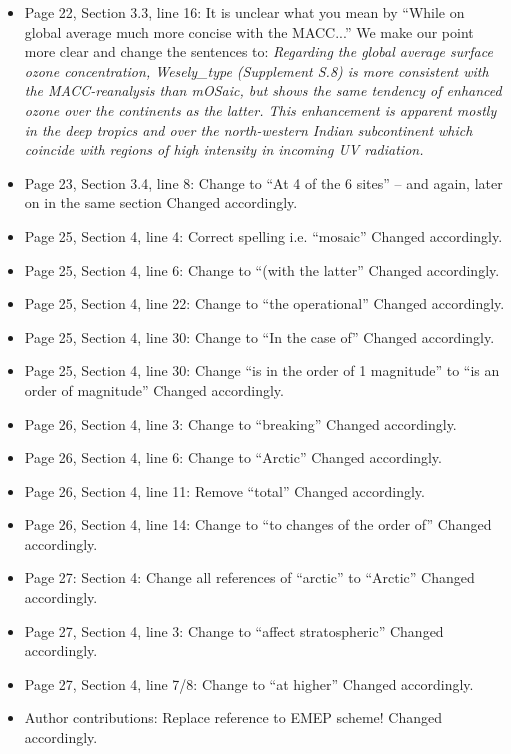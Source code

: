 \begin{itemize}
\item {\color{blue}Page 22, Section 3.3, line 16: It is unclear what you mean by “While on global average much more concise with the MACC...”}
  We make our point more clear and change the sentences to: \emph{Regarding the global average surface ozone concentration, \emph{Wesely\_type} (Supplement S.8) is more consistent with the MACC-reanalysis than \emph{mOSaic}, but shows the same tendency of enhanced ozone over the continents as the latter.
This enhancement is apparent mostly in the deep tropics and over the north-western Indian subcontinent which coincide with regions of high intensity in incoming UV radiation.}
\item {\color{blue}Page 23, Section 3.4, line 8: Change to “At 4 of the 6 sites” – and again, later on in the same section}
  Changed accordingly.
\item {\color{blue}Page 25, Section 4, line 4: Correct spelling i.e. “mosaic”}
  Changed accordingly.
\item {\color{blue}Page 25, Section 4, line 6: Change to “(with the latter”}
  Changed accordingly.
\item {\color{blue}Page 25, Section 4, line 22: Change to “the operational”}
  Changed accordingly.
\item {\color{blue}Page 25, Section 4, line 30: Change to “In the case of”}
  Changed accordingly.
\item {\color{blue}Page 25, Section 4, line 30: Change “is in the order of 1 magnitude” to “is an order of magnitude”}
  Changed accordingly.
\item {\color{blue}Page 26, Section 4, line 3: Change to “breaking”}
  Changed accordingly.
\item {\color{blue}Page 26, Section 4, line 6: Change to “Arctic”}
  Changed accordingly.
\item {\color{blue}Page 26, Section 4, line 11: Remove “total”}
  Changed accordingly.
\item {\color{blue}Page 26, Section 4, line 14: Change to “to changes of the order of”}
  Changed accordingly.
\item {\color{blue}Page 27: Section 4: Change all references of “arctic” to “Arctic”}
  Changed accordingly.
\item {\color{blue}Page 27, Section 4, line 3: Change to “affect stratospheric”}
  Changed accordingly.
\item {\color{blue}Page 27, Section 4, line 7/8: Change to “at higher”}
  Changed accordingly.
\item {\color{blue}Author contributions: Replace reference to EMEP scheme!}
  Changed accordingly.
\end{itemize}
\newpage
%
